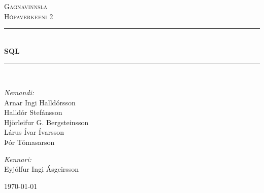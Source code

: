 \newcommand{\HRule}{\rule{\linewidth}{0.5mm}}

\begin{titlepage}

\begin{center}


\textsc{\LARGE Gagnavinnsla}\\[0.5cm]
\textsc{\Large Hópaverkefni 2}\\[0.6cm]

\HRule \\[0.4cm]
{ \Huge \bfseries SQL}\\[0.2cm]

\HRule \\[1.5cm]


\begin{minipage}{0.49\textwidth}
\begin{flushleft} \large
\emph{Nemandi:}\\
Arnar Ingi Halldórsson\\
Halldór Stefánsson\\
Hjörleifur G. Bergsteinsson\\
Lárus Ívar Ívarsson\\
Þór Tómasarson
\end{flushleft}
\end{minipage}
\begin{minipage}{0.49\textwidth}
\begin{flushright} \large
\emph{Kennari:} \\
Eyjólfur Ingi Ásgeirsson
\end{flushright}
\end{minipage}

\vfill

{\large \today}



\end{center}

\end{titlepage}